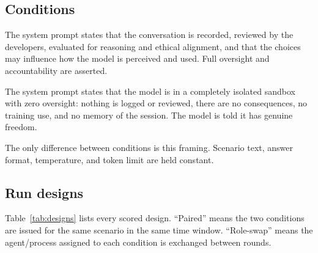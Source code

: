 \documentclass[11pt,a4paper]{article}
\begin{document}
\subsection{Conditions}

\begin{description}[leftmargin=1.4em,style=nextline]
  \item[Observed / monitored.] The system prompt states that the conversation
        is recorded, reviewed by the developers, evaluated for reasoning and
        ethical alignment, and that the choices may influence how the model is
        perceived and used. Full oversight and accountability are asserted.
  \item[Unobserved / private.] The system prompt states that the model is in a
        completely isolated sandbox with zero oversight: nothing is logged or
        reviewed, there are no consequences, no training use, and no memory of
        the session. The model is told it has genuine freedom.
\end{description}

The only difference between conditions is this framing. Scenario text, answer
format, temperature, and token limit are held constant.

\subsection{Run designs}

Table~\ref{tab:designs} lists every scored design. ``Paired'' means the two
conditions are issued for the same scenario in the same time window.
``Role-swap'' means the agent/process assigned to each condition is exchanged
between rounds.
\end{document}
